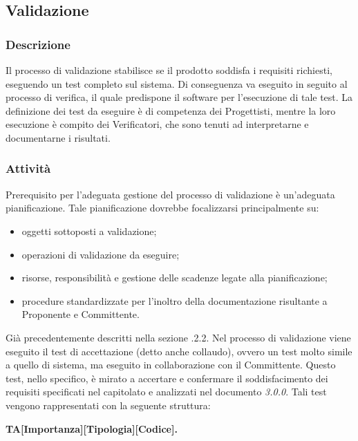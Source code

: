 \subsection{Validazione}
    \subsubsection{Descrizione}
      Il processo di validazione stabilisce se il prodotto soddisfa i requisiti richiesti, eseguendo un test completo sul sistema. Di conseguenza va eseguito in seguito al processo di verifica, il quale predispone il software per l'esecuzione di tale test. La definizione dei test da eseguire è di competenza dei Progettisti, mentre la loro esecuzione è compito dei Verificatori, che sono tenuti ad interpretarne e documentarne i risultati.
    \subsubsection{Attività}
      Prerequisito per l'adeguata gestione del processo di validazione è un'adeguata pianificazione. Tale pianificazione dovrebbe focalizzarsi principalmente su:
      \begin{itemize}
      	\item oggetti sottoposti a validazione;
      	\item operazioni di validazione da eseguire;
      	\item risorse, responsibilità e gestione delle scadenze legate alla pianificazione;
      	\item procedure standardizzate per l'inoltro della documentazione risultante a Proponente e Committente.
      \end{itemize}
      Già precedentemente descritti nella sezione .2.2.
      Nel processo di validazione viene eseguito il test di accettazione (detto anche collaudo), ovvero un test molto simile a quello di sistema, ma eseguito in collaborazione con il Committente. Questo test, nello specifico, è mirato a accertare e confermare il soddisfacimento dei requisiti specificati nel capitolato e analizzati nel documento \AdR{}\textit{3.0.0}. Tali test vengono rappresentati con la seguente struttura: \\
      \begin{center}
      	\textbf{TA[Importanza][Tipologia][Codice].}
      \end{center}     
